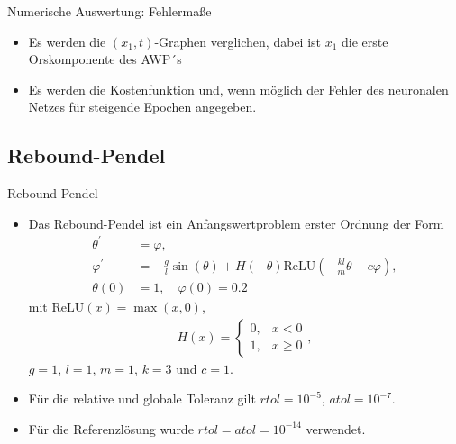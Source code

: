 \begin{frame}{Numerische Auswertung: Fehlermaße}
    \begin{itemize}
        \item<1-> Es werden die $(x_1,t)$-Graphen verglichen, dabei ist $x_1$ die erste Orskomponente des AWP´s
        \item<2-> Es werden die Kostenfunktion und, wenn möglich der Fehler des neuronalen Netzes für steigende Epochen
        angegeben.
    \end{itemize}
\end{frame}

\subsection{Rebound-Pendel}

\begin{frame}{Rebound-Pendel}
    \begin{itemize}
        \item<1-> Das Rebound-Pendel ist ein Anfangswertproblem erster Ordnung der Form
        \begin{align}
            \theta^{\prime} &= \varphi, \nonumber \\
            \varphi^{\prime} &= - \frac{g}{l} \sin(\theta) + H(-\theta)
            \text{ReLU}(-\frac{kl}{m}\theta - c \varphi), \label{rebound-pendulum}\\
            \theta(0) &= 1, \quad \varphi(0)=0.2 \nonumber
        \end{align}
        mit $\text{ReLU}(x)= \max(x, 0)$,
        \begin{align*}
            H(x) =
            \begin{cases}
                0, &x<0 \\
                1, &x \geq 0
            \end{cases},
        \end{align*}
        $g=1$, $l=1$, $m=1$, $k=3$ und $c=1$.
        \item<2-> Für die relative und globale Toleranz gilt $rtol=10^{-5}$, $atol=10^{-7}$.
        \item<3-> Für die Referenzlösung wurde $rtol=atol=10^{-14}$ verwendet.
    \end{itemize}
\end{frame}

